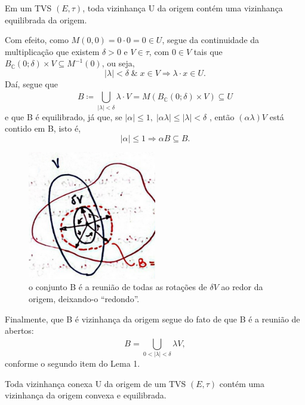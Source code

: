 \documentclass[../distribution_theory_notes.tex]{subfiles}
\begin{document}
\begin{theorem*}
	Em um TVS \((E, \tau )\), toda vizinhança U da origem contém uma vizinhança equilibrada da origem.
\end{theorem*}
\begin{proof*}
	Com efeito, como \(M(0, 0)=0 \cdot 0 = 0\in U\), segue da continuidade da multiplicação que existem \(\delta > 0\) e \(V\in \tau \), com \(0\in V\) tais que \(B_{\mathbb{C}}(0; \delta )\times V\subseteq M^{-1}(0)\), ou seja,
	\[
		|\lambda |<\delta \;\&\; x\in V \Rightarrow \lambda \cdot x\in U.
	\]
	Daí, segue que
	\[
		B\coloneqq \bigcup_{|\lambda |<\delta }^{}\lambda \cdot V=M(B_{\mathbb{C}}(0; \delta ) \times V) \subseteq U
	\]
	e que B é equilibrado, já que, se \(|\alpha |\leq 1,\; |\alpha \lambda |\leq |\lambda |<\delta \) , então \((\alpha \lambda )V\) está contido em B, isto é,
	\[
		|\alpha |\leq 1 \Rightarrow \alpha B \subseteq B.
	\]
	\begin{figure}[H]
		\begin{center}
			\includegraphics[height=0.5\textheight, width=0.5\textwidth, keepaspectratio]{./Images/open_union_2.png}
		\end{center}
		\caption{o conjunto B é a reunião de todas as rotações de \(\delta V\) ao redor da origem, deixando-o ``redondo''.}
	\end{figure}

	Finalmente, que B é vizinhança da origem segue do fato de que B é a reunião de abertos:
	\[
		B = \bigcup_{0<|\lambda |<\delta }^{}\lambda V,
	\]
	conforme o segundo item do Lema 1.
\end{proof*}
\begin{theorem*}
	Toda vizinhança conexa U da origem de um TVS \((E, \tau )\) contém uma vizinhança da origem convexa e equilibrada.
\end{theorem*}
\end{document}
